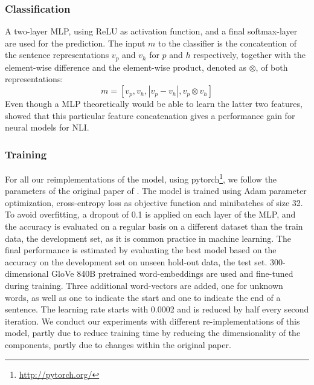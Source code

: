 \subsubsection{Classification}
A two-layer \ac{MLP}, using \ac{ReLU} as activation function, and a final softmax-layer are used for the prediction. The input $m$ to the classifier is the concatention of the sentence representations $v_p$ and $v_h$ for $p$ and $h$ respectively, together with the element-wise difference and the element-wise product, denoted as $\otimes$, of both representations:
\begin{equation}
m = [v_p, v_h, |v_p-v_h|, v_p \otimes v_h]
\end{equation}
Even though a \ac{MLP} theoretically would be able to learn the latter two features, \cite{mou2015natural} showed that this particular feature concatenation gives a performance gain for neural models for \ac{NLI}.
\subsubsection{Training}
For all our reimplementations of the model, using pytorch\footnote{\href{http://pytorch.org/}{http://pytorch.org/}}, we follow the parameters of the original paper of \cite{nie2017shortcut}. The model is trained using Adam \citep{kingma2014adam} parameter optimization, cross-entropy loss as objective function and minibatches of size 32. To avoid overfitting, a dropout of 0.1 is applied on each layer of the \ac{MLP}, and the accuracy is evaluated on a regular basis on a different dataset than the train data, the development set, as it is common practice in machine learning. The final performance is estimated by evaluating the best model based on the accuracy on the development set on unseen hold-out data, the test set. 300-dimensional GloVe 840B pretrained word-embeddings \citep{pennington2014glove} are used and fine-tuned during training. Three additional word-vectors are added, one for unknown words, as well as one to indicate the start and one to indicate the end of a sentence. The learning rate starts with 0.0002 and is reduced by half every second iteration. We conduct our experiments with different re-implementations of this model, partly due to reduce training time by reducing the dimensionality of the components, partly due to changes within the original paper.
